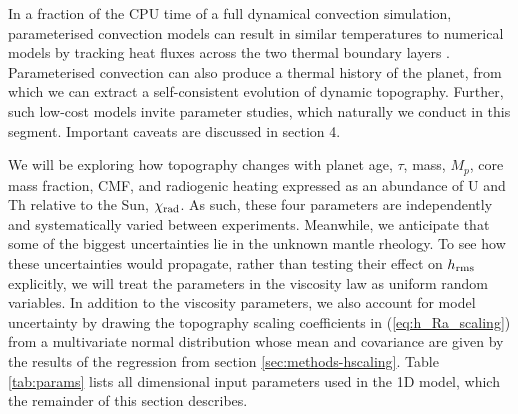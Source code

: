 


In a fraction of the CPU time of a full dynamical convection simulation, parameterised convection models can result in similar temperatures to numerical models by tracking heat fluxes across the two thermal boundary layers \citep{thiriet_scaling_2019}. Parameterised convection can also produce a thermal history of the planet, from which we can extract a self-consistent evolution of dynamic topography. Further, such low-cost models invite parameter studies, which naturally we conduct in this segment. Important caveats are discussed in section 4.

We will be exploring how topography changes with planet age, $\tau$, mass, $M_p$, core mass fraction, CMF, and radiogenic heating expressed as an abundance of U and Th relative to the Sun, $\chi_{\rm rad}$. As such, these four parameters are independently and systematically varied between experiments. Meanwhile, we anticipate that some of the biggest uncertainties lie in the unknown mantle rheology. To see how these uncertainties would propagate, rather than testing their effect on $h_{\rm rms}$ explicitly, we will treat the parameters in the viscosity law as uniform random variables. In addition to the viscosity parameters, we also account for model uncertainty by drawing the topography scaling coefficients in (\ref{eq:h_Ra_scaling}) from a multivariate normal distribution whose mean and covariance are given by the results of the regression from section \ref{sec:methods-hscaling}. Table \ref{tab:params} lists all dimensional input parameters used in the 1D model, which the remainder of this section describes.

